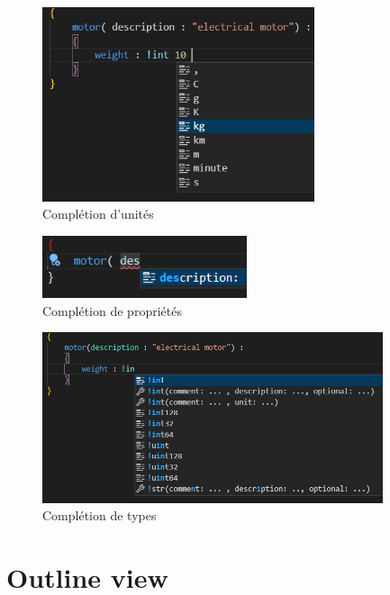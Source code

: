 \documentclass[
    iict, %
    il, %
]{heig-tb}
\begin{document}
\begin{figure}[H]
    \begin{center}
        \includegraphics[width=8cm]{assets/figures/completion.PNG}
    \end{center}
    \caption[Complétion d'unités]{\label{unit-completion} Complétion d'unités}
\end{figure}

\begin{figure}[H]
    \begin{center}
        \includegraphics[width=6cm]{assets/figures/property-completion.PNG}
    \end{center}
    \caption[Complétion de propriétés]{\label{property-completion} Complétion de propriétés}
\end{figure}

\begin{figure}[H]
    \begin{center}
        \includegraphics[width=10cm]{assets/figures/type-completion.PNG}
    \end{center}
    \caption[Complétion de types]{\label{type-completion} Complétion de types}
\end{figure}


\section{Outline view}
\end{document}

